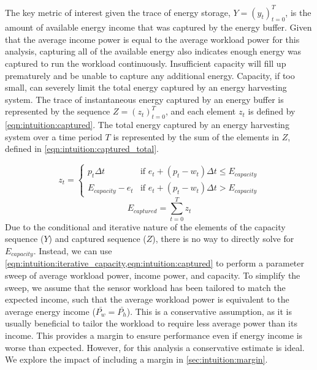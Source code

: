 The key metric of interest given the trace of energy storage, $Y = (y_t)_{t=0}^T$, is  
the amount of available energy income that was captured by the energy buffer. 
Given that the average income power is equal to the average workload power for this analysis, capturing all of the available energy also indicates enough energy was captured to run the workload continuously. 
Insufficient capacity will fill up prematurely and be unable to capture any additional energy. 
Capacity, if too small, can severely limit the total energy captured by an energy harvesting system.
The trace of instantaneous energy captured by an energy buffer is represented by the sequence $Z = (z_t)^T_{t=0}$, and each element $z_t$ is defined by \cref{eqn:intuition:captured}. The total energy captured by an energy harvesting system over a time period $T$ is represented by the sum of the elements in $Z$, defined in \cref{eqn:intuition:captured_total}.

\begin{equation} \label{eqn:intuition:captured}
    z_t = \begin{cases}
        p_t \Delta t & \text{if $e_t + (p_t - w_t) \Delta t \leq E_{capacity}$} \\
        E_{capacity} - e_t & \text{if $e_t + (p_t - w_t) \Delta t > E_{capacity}$} 
    \end{cases}
\end{equation}
\begin{equation} \label{eqn:intuition:captured_total}
    E_{captured} = \sum^T_{t=0} z_t
\end{equation}
Due to the conditional and iterative nature of the elements of the capacity sequence ($Y$) and captured sequence ($Z$), there is no way to directly solve for $E_{capacity}$.
Instead, we can use \cref{eqn:intuition:iterative_capacity,eqn:intuition:captured} to perform a parameter sweep of average workload power, income power, and capacity.
To simplify the sweep, we assume that the sensor workload has been tailored to match the expected income, such that the average workload power is equivalent to the average energy income ($\bar{P_w} = \bar{P_h}$). 
This is a conservative assumption, as it is usually beneficial to tailor the workload to require less average power than its income. 
This provides a margin to ensure performance even if energy income is worse than expected. However, for this analysis a conservative estimate is ideal. We explore the impact of including a margin in \cref{sec:intuition:margin}.

